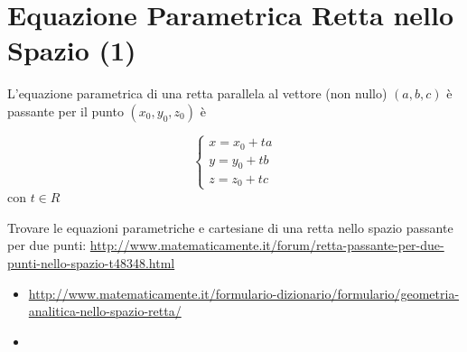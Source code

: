 \section{Equazione Parametrica Retta nello Spazio (1)}
\begin{definizione}
L'equazione parametrica di una retta parallela al vettore (non nullo) $(a,b,c)$ è passante per il punto $(x_0,y_0,z_0)$ è

 \begin{equation}
   \begin{cases}
   x=x_0 + ta \\
   y=y_0 + tb \\
   z=z_0 + tc
   \end{cases}
\end{equation}
con $t \in R$

\end{definizione}

\begin{osservazione}
Trovare le equazioni parametriche e cartesiane di una retta nello spazio passante per due punti: 
\url{http://www.matematicamente.it/forum/retta-passante-per-due-punti-nello-spazio-t48348.html}
\end{osservazione}




\begin{osservazione}
\begin{itemize}
 \item \url{http://www.matematicamente.it/formulario-dizionario/formulario/geometria-analitica-nello-spazio-retta/}
 \item \url{}
\end{itemize}
\end{osservazione}

